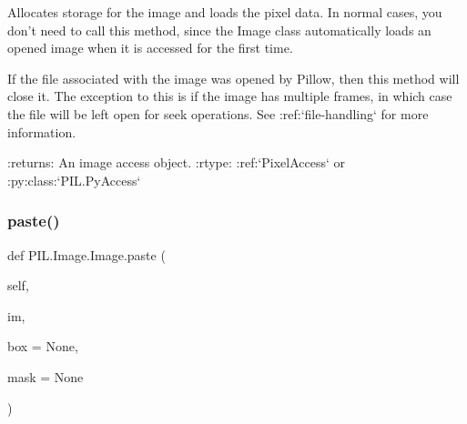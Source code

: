 \begin{DoxyVerb}Allocates storage for the image and loads the pixel data.  In
normal cases, you don't need to call this method, since the
Image class automatically loads an opened image when it is
accessed for the first time.

If the file associated with the image was opened by Pillow, then this
method will close it. The exception to this is if the image has
multiple frames, in which case the file will be left open for seek
operations. See :ref:`file-handling` for more information.

:returns: An image access object.
:rtype: :ref:`PixelAccess` or :py:class:`PIL.PyAccess`
\end{DoxyVerb}
 \mbox{\label{classPIL_1_1Image_1_1Image_aa6597671ba43a60f779a1cb4e884a75d}} 
\subsubsection{\texorpdfstring{paste()}{paste()}}
{\footnotesize\ttfamily def P\+I\+L.\+Image.\+Image.\+paste (\begin{DoxyParamCaption}\item[{}]{self,  }\item[{}]{im,  }\item[{}]{box = {\ttfamily None},  }\item[{}]{mask = {\ttfamily None} }\end{DoxyParamCaption})}

